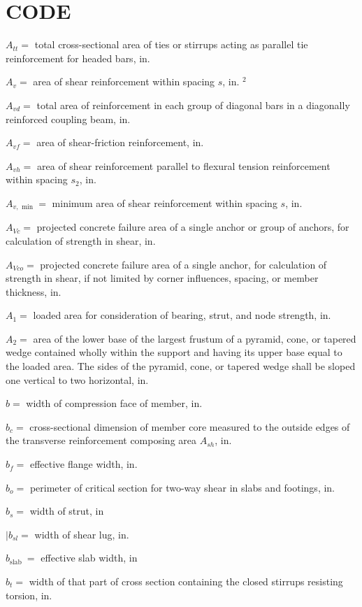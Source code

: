 \documentclass[10pt]{article}
\begin{document}
\section*{CODE}
$A_{t t}=$ total cross-sectional area of ties or stirrups acting as parallel tie reinforcement for headed bars, in.  

$A_{v}=$ area of shear reinforcement within spacing $s$, in. $^{2}$

$A_{v d}=$ total area of reinforcement in each group of diagonal bars in a diagonally reinforced coupling beam, in.  

$A_{v f}=$ area of shear-friction reinforcement, in.  

$A_{v h}=$ area of shear reinforcement parallel to flexural tension reinforcement within spacing $s_{2}$, in.  

$A_{v, \text { min }}=$ minimum area of shear reinforcement within spacing $s$, in.  

$A_{V c}=$ projected concrete failure area of a single anchor or group of anchors, for calculation of strength in shear, in.  

$A_{V c o}=$ projected concrete failure area of a single anchor, for calculation of strength in shear, if not limited by corner influences, spacing, or member thickness, in.  

$A_{1}=$ loaded area for consideration of bearing, strut, and node strength, in.  

$A_{2}=$ area of the lower base of the largest frustum of a pyramid, cone, or tapered wedge contained wholly within the support and having its upper base equal to the loaded area. The sides of the pyramid, cone, or tapered wedge shall be sloped one vertical to two horizontal, in.  

$b=$ width of compression face of member, in.

$b_{c}=$ cross-sectional dimension of member core measured to the outside edges of the transverse reinforcement composing area $A_{s h}$, in.

$b_{f}=$ effective flange width, in.

$b_{o}=$ perimeter of critical section for two-way shear in slabs and footings, in.

$b_{s}=$ width of strut, in

$\mid b_{s l}=$ width of shear lug, in.

$b_{\text {slab }}=$ effective slab width, in

$b_{t}=$ width of that part of cross section containing the closed stirrups resisting torsion, in.
\end{document}
